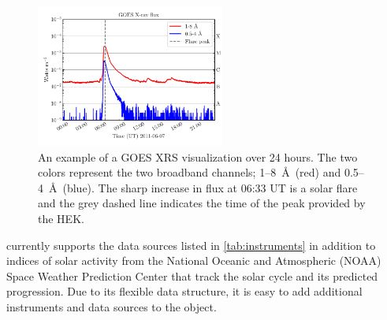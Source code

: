 \begin{figure}
    \centering
    \includegraphics[width=0.55\textwidth]{figures/timeseries_example.pdf}
    \caption{An example of a GOES XRS \Timeseries visualization over 24 hours. The two colors represent the two broadband channels; 1--8~\AA\ (red) and 0.5--4~\AA\ (blue).  The sharp increase in flux at 06:33 UT is a solar flare and the grey dashed line indicates the time of the peak provided by the HEK.}
    \label{fig:timeseries_example}
\end{figure}

\Timeseries currently supports the data sources listed in \autoref{tab:instruments} in addition to indices of solar activity from the National Oceanic and Atmospheric (NOAA) Space Weather Prediction Center that track the solar cycle and its predicted progression. Due to its flexible data structure, it is easy to add additional instruments and data sources to the \Timeseries object.

